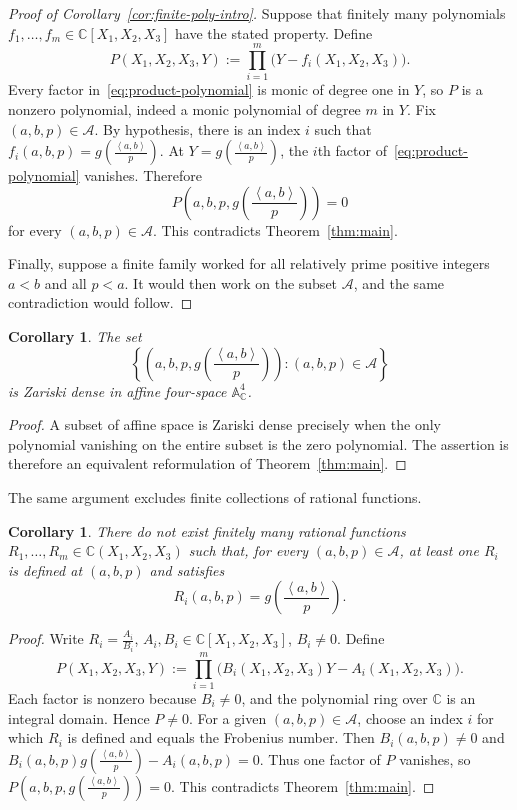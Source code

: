 \documentclass[reqno, 12pt]{article}
\numberwithin{equation}{section}
\newtheorem{corollary}[theorem]{Corollary}
\theoremstyle{definition}
\newcommand{\CC}{\mathbb{C}}
\newcommand{\cA}{\mathcal{A}}
\newcommand{\gen}[1]{\left\langle #1\right\rangle}
\begin{document}
\begin{proof}[Proof of Corollary~\ref{cor:finite-poly-intro}]
Suppose that finitely many polynomials $f_1,\ldots,f_m\in\CC[X_1,X_2,X_3]$
have the stated property.  Define
\begin{equation}\label{eq:product-polynomial}
P(X_1,X_2,X_3,Y):=\prod_{i=1}^{m}\bigl(Y-f_i(X_1,X_2,X_3)\bigr).
\end{equation}
Every factor in~\cref{eq:product-polynomial} is monic of degree one in $Y$,
so $P$ is a nonzero polynomial, indeed a monic polynomial of degree $m$ in
$Y$.
Fix $(a,b,p)\in\cA$.  By hypothesis, there is an index $i$ such that $f_i(a,b,p) =g\!\left(\frac{\gen{a,b}}{p}\right)$.
At $Y=g\!\left(\frac{\gen{a,b}}{p}\right)$, the $i$th factor of~\cref{eq:product-polynomial} vanishes.  Therefore
\[ P\left(a,b,p,g\!\left(\frac{\gen{a,b}}{p}\right)\right)=0\]
for every $(a,b,p)\in\cA$.  This contradicts Theorem~\ref{thm:main}.

Finally, suppose a finite family worked for all relatively prime positive integers $a<b$ and all $p<a$.  It would then work on the subset $\cA$, and the same contradiction would follow.
\end{proof}

\begin{corollary}\label{cor:zariski}
The set
\[\left\{\left(a,b,p,g\!\left(\frac{\gen{a,b}}{p}\right)\right):(a,b,p)\in\cA\right\}
\]
is Zariski dense in affine four-space $\mathbb A^4_{\CC}$.
\end{corollary}
\begin{proof}
A subset of affine space is Zariski dense precisely when the only polynomial vanishing on the entire subset is the zero polynomial.  The assertion is therefore an equivalent reformulation of Theorem~\ref{thm:main}.
\end{proof}

The same argument excludes finite collections of rational functions.

\begin{corollary}\label{cor:rational}
There do not exist finitely many rational functions $R_1,\ldots,R_m\in\CC(X_1,X_2,X_3)$ such that, for every $(a,b,p)\in\cA$, at least one $R_i$ is defined at $(a,b,p)$ and satisfies
\[R_i(a,b,p)=g\!\left(\frac{\gen{a,b}}{p}\right).
\]
\end{corollary}
\begin{proof}
Write $R_i=\frac{A_i}{B_i}$, $A_i,B_i\in\CC[X_1,X_2,X_3]$, $B_i\neq0$. Define
\[P(X_1,X_2,X_3,Y):=\prod_{i=1}^{m}\bigl(B_i(X_1,X_2,X_3)Y-A_i(X_1,X_2,X_3)\bigr).
\]
Each factor is nonzero because $B_i\neq0$, and the polynomial ring over
$\CC$ is an integral domain.  Hence $P\neq0$.
For a given $(a,b,p)\in\cA$, choose an index $i$ for which $R_i$ is defined
and equals the Frobenius number.  Then $B_i(a,b,p)\neq0$ and $B_i(a,b,p)g\!\left(\frac{\gen{a,b}}{p}\right)-A_i(a,b,p)=0$.
Thus one factor of $P$ vanishes, so $P\left(a,b,p,g\!\left(\frac{\gen{a,b}}{p}\right)\right)=0$.
This contradicts Theorem~\ref{thm:main}.
\end{proof}
\end{document}
